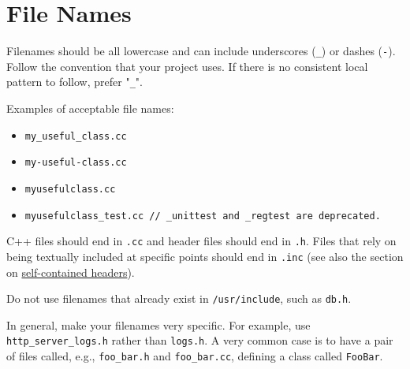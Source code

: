 
\section{File Names}\label{sec:file-names}
Filenames should be all lowercase and can include underscores (\texttt{_}) or dashes (\texttt{-}). Follow the convention that your project uses. If there is no consistent local pattern to follow, prefer "\texttt{_}".

Examples of acceptable file names:
\begin{itemize}
    \item \texttt{my_useful_class.cc}
    \item \texttt{my-useful-class.cc}
    \item \texttt{myusefulclass.cc}
    \item \texttt{myusefulclass_test.cc // _unittest and _regtest are deprecated.}
\end{itemize}
C++ files should end in \texttt{.cc} and header files should end in \texttt{.h}. Files that rely on being textually included at specific points should end in \texttt{.inc} (see also the section on \hyperref[sec:self-contained-headers]{self-contained headers}).

Do not use filenames that already exist in \texttt{/usr/include}, such as \texttt{db.h}.

In general, make your filenames very specific. For example, use \texttt{http_server_logs.h} rather than \texttt{logs.h}. A very common case is to have a pair of files called, e.g., \texttt{foo_bar.h} and \texttt{foo_bar.cc}, defining a class called \texttt{FooBar}.
